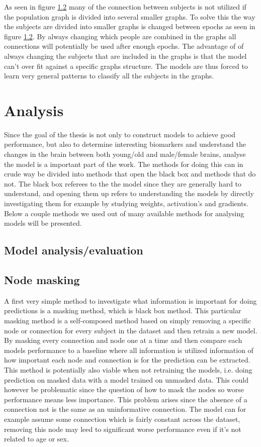 As seen in figure \ref{} many of the connection between subjects is not utilized if the population graph is divided into several smaller graphs. To solve this the way the subjects are divided into smaller graphs is changed between epochs as seen in figure \ref{}. By always changing which people are combined in the graphs all connections will potentially be used after enough epochs. The advantage of of always changing the subjects that are included in the graphs is that the model can't over fit against a specific graphs structure. The models are thus forced to learn very general patterns to classify all the subjects in the graphs. 




\section{Analysis}
Since the goal of the thesis is not only to construct models to achieve good performance, but also to determine interesting biomarkers and understand the changes in the brain between both young/old and male/female brains, analyse the model is a important part of the work. The methods for doing this can in crude way be divided into methods that open the black box and methods that do not. The black box referees to the the model since they are generally hard to understand, and opening them up refers to understanding the models by directly investigating them for example by studying weights, activation's and gradients. Below a couple methods we used out of many available methods for analysing models will be presented. 


\subsection{Model analysis/evaluation}
\subsection{Node masking}
A first very simple method to investigate what information is important  for doing predictions is a masking method, which is black box method. This particular masking method is a self-composed method based on simply removing a specific node or connection for every subject in the dataset and then retrain a new model. By masking every connection and node one at a time and then compare each models performance to a baseline where all information is utilized information of how important each node and connection is for the prediction can be extracted. This method is potentially also viable when not retraining the models, i.e. doing prediction on masked data with a model trained on unmasked data. This could however be problematic since the question of how to mask the nodes so worse performance means less importance. This problem arises since the absence of a connection not is the same as an uninformative connection. The model can for example assume some connection which is fairly constant across the dataset, removing this node may leed to significant worse performance even if it's not related to age or sex.

